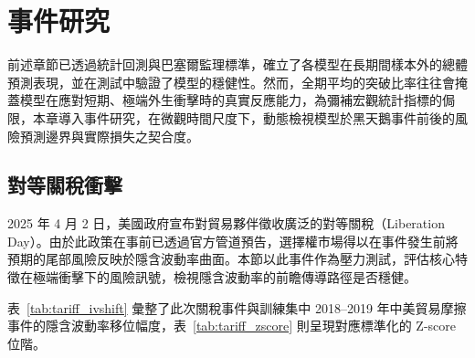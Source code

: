 \chapter{事件研究}
\label{chap:events}
\label{sec:event_preview}
前述章節已透過統計回測與巴塞爾監理標準，確立了各模型在長期間樣本外的總體預測表現，並在測試中驗證了模型的穩健性。然而，全期平均的突破比率往往會掩蓋模型在應對短期、極端外生衝擊時的真實反應能力，為彌補宏觀統計指標的侷限，本章導入事件研究，在微觀時間尺度下，動態檢視模型於黑天鵝事件前後的風險預測邊界與實際損失之契合度。

\section{對等關稅衝擊}
\label{sec:ev_tariff}

2025 年 4 月 2 日，美國政府宣布對貿易夥伴徵收廣泛的對等關稅（Liberation Day）。由於此政策在事前已透過官方管道預告，選擇權市場得以在事件發生前將預期的尾部風險反映於隱含波動率曲面。本節以此事件作為壓力測試，評估核心特徵在極端衝擊下的風險訊號，檢視隱含波動率的前瞻傳導路徑是否穩健。

表~\ref{tab:tariff_ivshift} 彙整了此次關稅事件與訓練集中 2018–2019 年中美貿易摩擦事件的隱含波動率移位幅度，表~\ref{tab:tariff_zscore} 則呈現對應標準化的 Z-score 位階。

